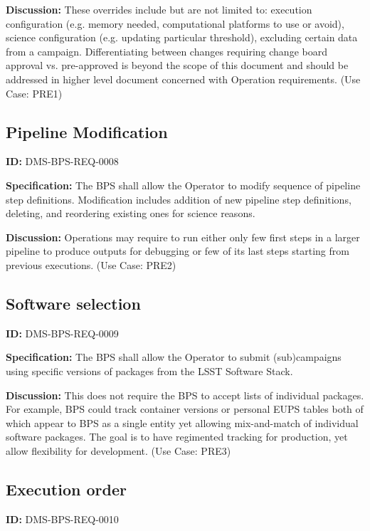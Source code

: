 \documentclass[SE,toc,lsstdraft]{lsstdoc}
\begin{document}
\textbf{Discussion:}
These overrides include but are not limited to: execution configuration (e.g. memory needed, computational platforms to use or avoid), science configuration (e.g. updating particular threshold), excluding certain data from a campaign. Differentiating between changes requiring change board approval vs. pre-approved is beyond the scope of this document and should be addressed in higher level document concerned with Operation requirements. (Use Case: PRE1)

\subsection{Pipeline Modification}

\label{DMS-BPS-REQ-0008}
\textbf{ID:} DMS-BPS-REQ-0008

\textbf{Specification:}
The BPS shall allow the Operator to modify sequence of pipeline step definitions.  Modification includes addition of new pipeline step definitions, deleting, and reordering existing ones for science reasons.

\textbf{Discussion:}
Operations may require to run either only few first steps in a larger pipeline to produce outputs for debugging or few of its last steps starting from previous executions. (Use Case: PRE2)

\subsection{Software selection}

\label{DMS-BPS-REQ-0009}
\textbf{ID:} DMS-BPS-REQ-0009

\textbf{Specification:}
The BPS shall allow the Operator to submit (sub)campaigns using specific versions of packages from the LSST Software Stack.

\textbf{Discussion:}
This does not require the BPS to accept lists of individual packages. For example, BPS could track container versions or personal EUPS tables both of which appear to BPS as a single entity yet allowing mix-and-match of individual software packages. The goal is to have regimented tracking for production, yet allow flexibility for development.  (Use Case: PRE3)

\subsection{Execution order}

\label{DMS-BPS-REQ-0010}
\textbf{ID:} DMS-BPS-REQ-0010
\end{document}
